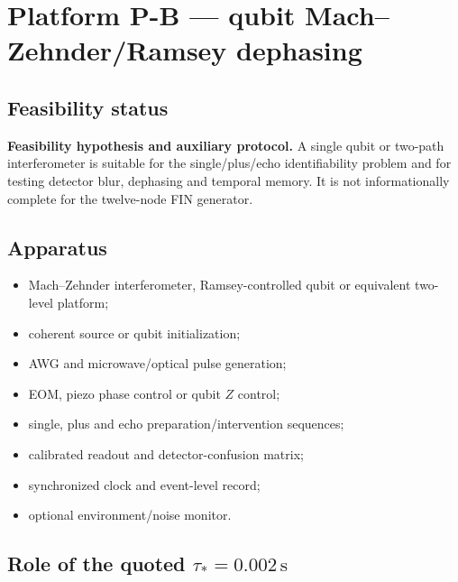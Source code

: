 \documentclass[11pt,a4paper,openany]{report}
\begin{document}
\chapter{Platform P-B --- qubit Mach--Zehnder/\allowbreak{}Ramsey dephasing}

\section{Feasibility status}

\textbf{Feasibility hypothesis and auxiliary protocol.} A single qubit or two-path interferometer is suitable for the single/\allowbreak{}plus/\allowbreak{}echo identifiability problem and for testing detector blur, dephasing and temporal memory. It is not informationally complete for the twelve-node FIN generator.

\section{Apparatus}

\begin{itemize}
\item 
Mach--Zehnder interferometer, Ramsey-controlled qubit or equivalent two-level platform;

\item 
coherent source or qubit initialization;

\item 
AWG and microwave/\allowbreak{}optical pulse generation;

\item 
EOM, piezo phase control or qubit \(Z\) control;

\item 
single, plus and echo preparation/\allowbreak{}intervention sequences;

\item 
calibrated readout and detector-confusion matrix;

\item 
synchronized clock and event-level record;

\item 
optional environment/\allowbreak{}noise monitor.

\end{itemize}

\section{\texorpdfstring{Role of the quoted \(\tau_*=0.002\,\mathrm{s}\)}{Role of the quoted \_*=0.002\textbackslash{},s}}
\end{document}
